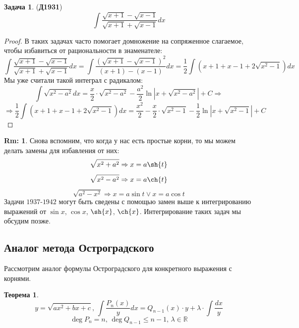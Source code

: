 \documentclass[12pt]{article}
\newcommand{\MR}{\mathbb{R}}
\theoremstyle{definition}
\newtheorem{rem}{Rm:}
\newtheorem{problem}{Задача}
\newtheorem{theorem}{Теорема}
\DeclareMathOperator{\dint}{\displaystyle\int}
\begin{document}
\begin{problem}(\textbf{Д1931})
	$$
		\dint \dfrac{\sqrt{x + 1} - \sqrt{x - 1}}{\sqrt{x + 1} + \sqrt{x - 1}}dx
	$$
\end{problem}
\begin{proof}
	В таких задачах часто помогает домножение на сопряженное слагаемое, чтобы избавиться от рациональности в знаменателе:
	$$
		\dint \dfrac{\sqrt{x + 1} - \sqrt{x - 1}}{\sqrt{x + 1} + \sqrt{x - 1}}dx = \dint\dfrac{\left(\sqrt{x + 1} - \sqrt{x - 1}\right)^2}{(x + 1) - (x - 1)}dx = \dfrac{1}{2}\dint\left(x + 1 + x- 1+ 2\sqrt{x^2 -1}\right)dx 
	$$
	Мы уже считали такой интеграл с радикалом:
	$$
		\dint \sqrt{x^2 - a^2}dx = \dfrac{x}{2}{\cdot}\sqrt{x^2 - a^2} - \dfrac{a^2}{2}\ln{\left|x + \sqrt{x^2 - a^2}\right|} + C \Rightarrow
	$$
	$$
		\Rightarrow \dfrac{1}{2}\dint\left(x + 1 + x- 1+ 2\sqrt{x^2 -1}\right)dx = \dfrac{x^2}{2} -  \dfrac{x}{2}{\cdot}\sqrt{x^2 - 1} - \dfrac{1}{2}\ln{\left|x + \sqrt{x^2 - 1}\right|} + C
	$$
\end{proof}
\begin{rem}
	Снова вспомним, что когда у нас есть простые корни, то мы можем делать замены для избавления от них:
	$$
		\sqrt{x^2 + a^2} \Rightarrow x = a\sh{t}
	$$
	$$
		\sqrt{x^2 -a^2} \Rightarrow x = a\ch{t}
	$$
	$$
		\sqrt{a^2 - x^2} \Rightarrow x = a\sin{t} \vee x = a\cos{t }
	$$
	Задачи $1937$-$1942$ могут быть сведены с помощью замен выше к интегрированию выражений от $\sin{x}$, $\cos{x}$, $\sh{x}$, $\ch{x}$. Интегрирование таких задач мы обсудим позже.
\end{rem}

\subsection*{Аналог метода Остроградского}

Рассмотрим аналог формулы Остроградского для конкретного выражения с корнями.
\begin{theorem}
	$$
		y = \sqrt{ax^2 + bx + c}, \, \dint \dfrac{P_n(x)}{y}dx = Q_{n-1}(x){\cdot}y + \lambda{\cdot}\dint\dfrac{dx}{y} 
	$$
	$$	
		\deg{P_n} = n,\, \deg{Q_{n-1}} \leq n-1, \, \lambda \in \MR 
	$$
	
\end{theorem}
\end{document}
